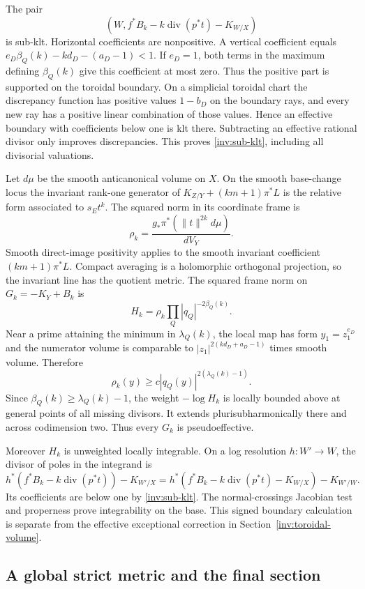 The pair
\begin{equation}\label{inv:sub-klt}
 (W,f^*B_k-k\operatorname{div}(p^*t)-K_{W/X})
\end{equation}
is sub-klt.  Horizontal coefficients are nonpositive.  A vertical
coefficient equals $e_D\beta_Q(k)-kd_D-(a_D-1)<1$.
If $e_D=1$, both terms in the maximum defining $\beta_Q(k)$ give
this coefficient at most zero.  Thus the positive part is supported on
the toroidal boundary.  On a simplicial toroidal chart the discrepancy
function has positive values $1-b_D$ on the boundary rays, and every
new ray has a positive linear combination of those values.  Hence an
effective boundary with coefficients below one is klt there.
Subtracting an effective rational divisor only improves discrepancies.
This proves \eqref{inv:sub-klt}, including all divisorial valuations.

Let $d\mu$ be the smooth anticanonical volume on $X$.  On the smooth
base-change locus the invariant rank-one generator of
$K_{Z/Y}+(km+1)\pi^*L$ is the relative form associated to
$s_Et^k$.  The squared norm in its coordinate frame is
\[
 \rho_k=\frac{g_*\pi^*(\|t\|^{2k}d\mu)}{dV_Y}.
\]
Smooth direct-image positivity applies to the smooth invariant
coefficient $(km+1)\pi^*L$.  Compact averaging is a holomorphic
orthogonal projection, so the invariant line has the quotient metric.
The squared frame norm on $G_k=-K_Y+B_k$ is
\[
 H_k=\rho_k\prod_Q|q_Q|^{-2\beta_Q(k)}.
\]
Near a prime attaining the minimum in $\lambda_Q(k)$, the local map
has form $y_1=z_1^{e_D}$ and the numerator volume is comparable to
$|z_1|^{2(kd_D+a_D-1)}$ times smooth volume.  Therefore
\[
 \rho_k(y)\ge c|q_Q(y)|^{2(\lambda_Q(k)-1)}.
\]
Since $\beta_Q(k)\ge\lambda_Q(k)-1$, the weight $-\log H_k$
is locally bounded above at general points of all missing divisors.
It extends plurisubharmonically there and across codimension two.
Thus every $G_k$ is pseudoeffective.

Moreover $H_k$ is unweighted locally integrable.  On a log resolution
$h:W'\to W$, the divisor of poles in the integrand is
\[
 h^*(f^*B_k-k\operatorname{div}(p^*t))-K_{W'/X}
 =h^*(f^*B_k-k\operatorname{div}(p^*t)-K_{W/X})-K_{W'/W}.
\]
Its coefficients are below one by \eqref{inv:sub-klt}.  The
normal-crossings Jacobian test and properness prove integrability
on the base.  This signed boundary calculation is separate from the
effective exceptional correction in Section~\ref{inv:toroidal-volume}.

\subsection{A global strict metric and the final section}

